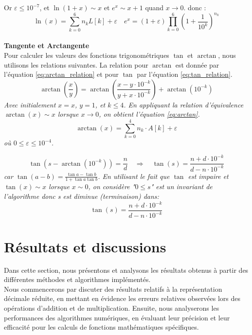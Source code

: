 \documentclass{article}
\begin{document}
Or $\varepsilon \leq 10^{-7}$, et $\ln(1+x) \sim x$ et $e^x \sim x+1$  quand $x \to 0$. donc :
\begin{equation}
\boxed{\ln(x)=\sum_{k=0}^6 n_k L[k] + \varepsilon}
\quad
\boxed{e^x = (1+\varepsilon) \prod_{k=0}^6 \left(1+\frac{1}{10^k}\right)^{n_k}}
\label{eq:exp_final}
\end{equation}
\\
\textbf{Tangente et Arctangente}\\
Pour calculer les valeurs des fonctions trigonométriques \( \tan \) et \( \arctan \), nous utilisons les relations suivantes. La relation pour \( \arctan \) est donnée par l'équation \ref{eq:arctan_relation} et pour \( \tan \) par l'équation \ref{eq:tan_relation}.
\begin{equation}
\arctan\left(\frac{x}{y}\right)=\arctan\left(\frac{x-y\cdot10^{-k}}{y+x\cdot10^{-k}}\right)+\arctan(10^{-k})
\label{eq:arctan_relation}
\end{equation}
\textit{Avec initialement \( x = x \), \( y = 1 \), et \( k \leq 4 \). En appliquant la relation d'équivalence \( \arctan(x) \sim x \) lorsque \( x \to 0 \), on obtient l'équation \ref{eq:arctan}.}
\begin{equation}
\arctan(x) = \sum_{k=0}^4 n_k \cdot A[k] + \varepsilon
\label{eq:arctan}
\end{equation}
\textit{où \( 0 \leq \varepsilon \leq 10^{-4} \).}

\begin{equation}
\tan\left(s - \arctan(10^{-k})\right) = \frac{n}{d} \quad \Rightarrow \quad \tan(s) = \frac{n + d \cdot 10^{-k}}{d - n \cdot 10^{-k}}
\label{eq:tan_relation}
\end{equation}
\textit{car  $\tan(a-b) = \frac{\tan a - \tan b}{1 + \tan a \tan b}$. En utilisant le fait que $\tan$ est impaire et $\tan(x) \sim x$ lorsque $x \sim 0$, on considère "$0 \leq s$" est un invariant de l'algorithme donc s est diminue (terminaison) dans:}
\begin{equation}
\tan(s)=\frac{n+d\cdot10^{-k}}{d-n\cdot10^{-k}}
\label{eq:tan}
\end{equation}

\section{Résultats et discussions}
Dans cette section, nous présentons et analysons les résultats obtenus à partir des différentes méthodes et algorithmes implémentés. \\
Nous commencerons par discuter des résultats relatifs à la représentation décimale réduite, en mettant en évidence les erreurs relatives observées lors des opérations d'addition et de multiplication. Ensuite, nous analyserons les performances des algorithmes numériques, en évaluant leur précision et leur efficacité pour les calculs de fonctions mathématiques spécifiques.
\end{document}

